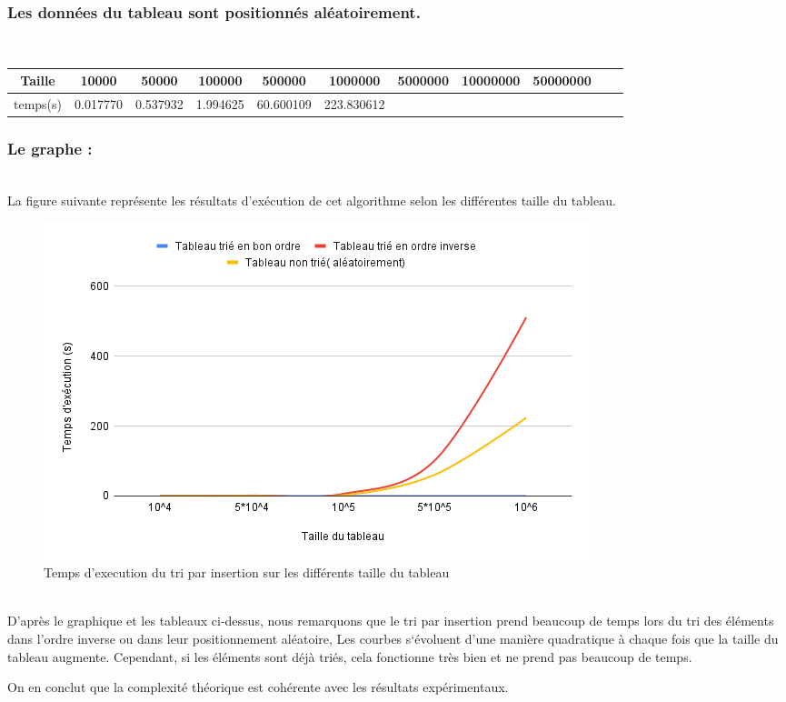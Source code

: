 \subsubsection{Les données du tableau sont  positionnés aléatoirement.}
\\
\begin{tabular}{| c | c | c | c | c | c | c | c | c | c | c |}
    \hline 
     Taille &  10000 & 50000 & 100000 & 500000 & 1000000 & 5000000 & 10000000 & 50000000  \\
    \hline
    temps(s) & 0.017770 &	0.537932 & 1.994625	 & 60.600109 &	223.830612 &  & &\\
    \hline
   
   
\end{tabular}
\par
\subsubsection{Le graphe :}
\\
La figure suivante représente les résultats d'exécution de cet algorithme selon les différentes taille du tableau.
\\
\begin{figure}[H]
    \centering
        \includegraphics[scale=0.7]{ressources/ChartInsert.png}
        \caption{Temps d'execution du tri par insertion sur les différents taille du tableau }
    \label{fig:insertch}
\end{figure}
\\
D’après le graphique et les tableaux ci-dessus, nous remarquons que le tri par insertion prend beaucoup de temps lors du tri des éléments dans l'ordre inverse ou dans leur positionnement aléatoire, Les courbes s‘évoluent d’une manière quadratique à chaque fois que la taille du tableau augmente. Cependant, si les éléments sont déjà triés, cela fonctionne très bien et ne prend pas beaucoup de temps. 
\par
On en conclut que la complexité théorique est cohérente avec les résultats expérimentaux.

